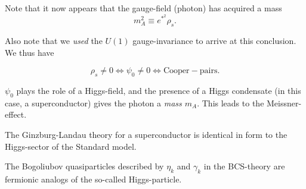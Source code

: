Note that it now appears that the gauge-field (photon) has acquired a mass 
\begin{equation}
m_A^2 \equiv  e^{*^2} \rho_s.
\end{equation}

Also note that we \emph{used} the $U(1)$ gauge-invariance to arrive at this conclusion. We thus have 

\begin{tcolorbox}
\begin{equation*}
\rho_s \neq 0 \iff \psi_0 \neq 0 \iff \mathrm{Cooper-pairs}.
\end{equation*}
\end{tcolorbox}

$\psi_0$ plays the role of a Higgs-field, and the presence of a Higgs condensate (in this case, a superconductor) gives the photon a \emph{mass $m_A$}. This leads to the Meissner-effect. 

The Ginzburg-Landau theory for a superconductor is identical in form to the Higgs-sector of the Standard model. 


\begin{tcolorbox}
The Bogoliubov quasiparticles described by $\eta_k$ and $\gamma_k$ in the BCS-theory are fermionic analogs of the so-called Higgs-particle. 
\end{tcolorbox}

